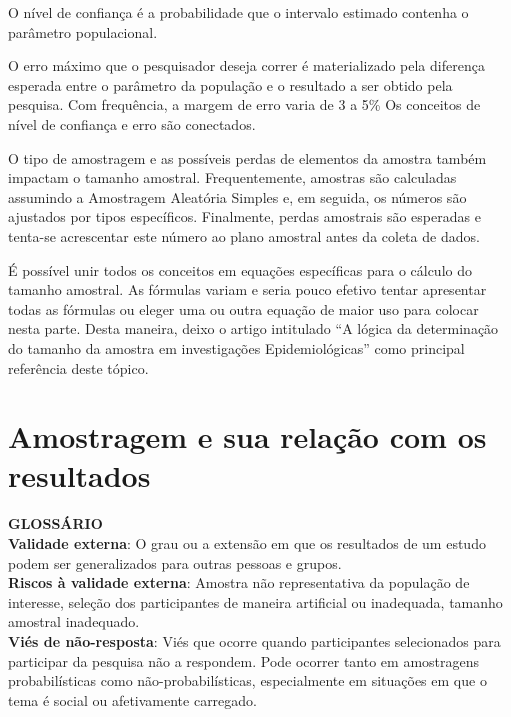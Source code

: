 \documentclass[
]{book}
\newenvironment{glossario}{
  \definecolor{shadecolor}{rgb}{0, 0, 0}  %
  \color{white}
  \begin{shaded}}
 {\end{shaded}}
\begin{document}
O nível de confiança é a probabilidade que o intervalo estimado contenha o parâmetro populacional.

O erro máximo que o pesquisador deseja correr é materializado pela diferença esperada entre o parâmetro da população e o resultado a ser obtido pela pesquisa. Com frequência, a margem de erro varia de 3 a 5\% Os conceitos de nível de confiança e erro são conectados.

O tipo de amostragem e as possíveis perdas de elementos da amostra também impactam o tamanho amostral. Frequentemente, amostras são calculadas assumindo a Amostragem Aleatória Simples e, em seguida, os números são ajustados por tipos específicos. Finalmente, perdas amostrais são esperadas e tenta-se acrescentar este número ao plano amostral antes da coleta de dados.

É possível unir todos os conceitos em equações específicas para o cálculo do tamanho amostral. As fórmulas variam e seria pouco efetivo tentar apresentar todas as fórmulas ou eleger uma ou outra equação de maior uso para colocar nesta parte. Desta maneira, deixo o artigo intitulado ``A lógica da determinação do tamanho da amostra em investigações Epidemiológicas'' como principal referência deste tópico.

\hypertarget{amostragem-e-sua-relauxe7uxe3o-com-os-resultados}{%
\section{Amostragem e sua relação com os resultados}\label{amostragem-e-sua-relauxe7uxe3o-com-os-resultados}}

\begin{glossario}

\textbf{GLOSSÁRIO}\\
\textbf{Validade externa}: O grau ou a extensão em que os resultados de um estudo podem ser generalizados para outras pessoas e grupos.\\
\textbf{Riscos à validade externa}: Amostra não representativa da população de interesse, seleção dos participantes de maneira artificial ou inadequada, tamanho amostral inadequado.\\
\textbf{Viés de não-resposta}: Viés que ocorre quando participantes selecionados para participar da pesquisa não a respondem. Pode ocorrer tanto em amostragens probabilísticas como não-probabilísticas, especialmente em situações em que o tema é social ou afetivamente carregado.

\end{glossario}
\end{document}
